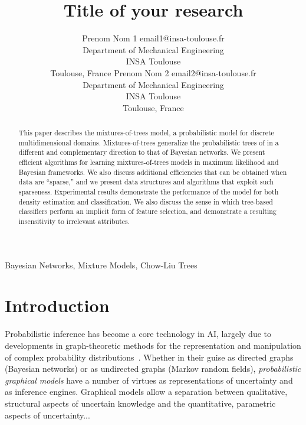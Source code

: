 \documentclass[twoside,11pt]{article}
\begin{document}
\title{Title of your research}

\author{\name Prenom Nom 1 \email email1@insa-toulouse.fr \\
       \addr Department of Mechanical Engineering \\
       INSA Toulouse\\
       Toulouse, France
       \AND
       \name Prenom Nom 2 \email email2@insa-toulouse.fr \\
       \addr Department of Mechanical Engineering \\
       INSA Toulouse\\
       Toulouse, France}


\maketitle

\begin{abstract}%
This paper describes the mixtures-of-trees model, a probabilistic 
model for discrete multidimensional domains.  Mixtures-of-trees 
generalize the probabilistic trees of \citet{chow:68}
in a different and complementary direction to that of Bayesian networks.
We present efficient algorithms for learning mixtures-of-trees 
models in maximum likelihood and Bayesian frameworks. 
We also discuss additional efficiencies that can be
obtained when data are ``sparse,'' and we present data 
structures and algorithms that exploit such sparseness.
Experimental results demonstrate the performance of the 
model for both density estimation and classification. 
We also discuss the sense in which tree-based classifiers
perform an implicit form of feature selection, and demonstrate
a resulting insensitivity to irrelevant attributes.
\end{abstract}

\begin{keywords}
  Bayesian Networks, Mixture Models, Chow-Liu Trees
\end{keywords}

\section{Introduction}

Probabilistic inference has become a core technology in AI,
largely due to developments in graph-theoretic methods for the 
representation and manipulation of complex probability 
distributions~\citep{pearl:88}.  Whether in their guise as 
directed graphs (Bayesian networks) or as undirected graphs (Markov 
random fields), \emph{probabilistic graphical models} have a number 
of virtues as representations of uncertainty and as inference engines.  
Graphical models allow a separation between qualitative, structural
aspects of uncertain knowledge and the quantitative, parametric aspects 
of uncertainty...\\
\end{document}
